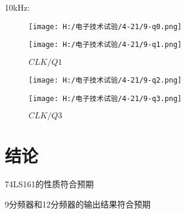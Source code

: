 \documentclass{article}
\begin{document}
\par
10kHz:\par
\begin{figure}[h]
  \begin{minipage}[t]{0.5\linewidth} %
    \centering   
    \texttt{[image: H:/电子技术试验/4-21/9-q0.png]}   
    \caption{$CLK/Q0$}   
    \label{fig:side:a}   
  \end{minipage}%
  \begin{minipage}[t]{0.5\linewidth}   
    \centering   
    \texttt{[image: H:/电子技术试验/4-21/9-q1.png]}   
    \caption{$CLK/Q1$}   
    \label{fig:side:b}   
  \end{minipage}   
\end{figure}
\newpage
\begin{figure}[h]
  \begin{minipage}[t]{0.5\linewidth} %
    \centering   
    \texttt{[image: H:/电子技术试验/4-21/9-q2.png]}   
    \caption{$CLK/Q2$}   
    \label{fig:side:a}   
  \end{minipage}%
  \begin{minipage}[t]{0.5\linewidth}   
    \centering   
    \texttt{[image: H:/电子技术试验/4-21/9-q3.png]}   
    \caption{$CLK/Q3$}   
    \label{fig:side:b}   
  \end{minipage}   
\end{figure}


\section{结论}

74LS161的性质符合预期\par
9分频器和12分频器的输出结果符合预期\par
\end{document}
